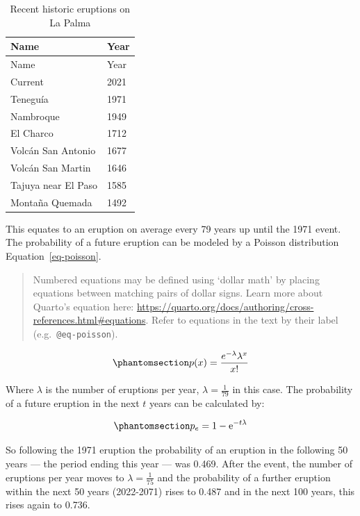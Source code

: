 \documentclass[
]{agujournal2019}
\begin{document}
\label{tbl-history}
\begin{longtable}[]{@{}ll@{}}
\caption{\label{tbl-history}Recent historic eruptions on La
Palma}\tabularnewline
\toprule\noalign{}
Name & Year \\
\midrule\noalign{}
\endfirsthead
\toprule\noalign{}
Name & Year \\
\midrule\noalign{}
\endhead
\bottomrule\noalign{}
\endlastfoot
Current & 2021 \\
Teneguía & 1971 \\
Nambroque & 1949 \\
El Charco & 1712 \\
Volcán San Antonio & 1677 \\
Volcán San Martin & 1646 \\
Tajuya near El Paso & 1585 \\
Montaña Quemada & 1492 \\
\end{longtable}

This equates to an eruption on average every 79 years up until the 1971
event. The probability of a future eruption can be modeled by a Poisson
distribution Equation~\ref{eq-poisson}.

\begin{quote}
Numbered equations may be defined using `dollar math' by placing
equations between matching pairs of dollar signs. Learn more about
Quarto's equation here:
\url{https://quarto.org/docs/authoring/cross-references.html\#equations}.
Refer to equations in the text by their label
(e.g.~\texttt{@eq-poisson}).
\end{quote}

\begin{equation}\phantomsection\label{eq-poisson}{
p(x)=\frac{e^{-\lambda} \lambda^{x}}{x !}
}\end{equation}

Where \(\lambda\) is the number of eruptions per year,
\(\lambda=\frac{1}{79}\) in this case. The probability of a future
eruption in the next \(t\) years can be calculated by:

\begin{equation}\phantomsection\label{eq-probability}{
p_e = 1-\mathrm{e}^{-t \lambda}
}\end{equation}

So following the 1971 eruption the probability of an eruption in the
following 50 years --- the period ending this year --- was 0.469. After
the event, the number of eruptions per year moves to
\(\lambda=\frac{1}{75}\) and the probability of a further eruption
within the next 50 years (2022-2071) rises to 0.487 and in the next 100
years, this rises again to 0.736.
\end{document}
